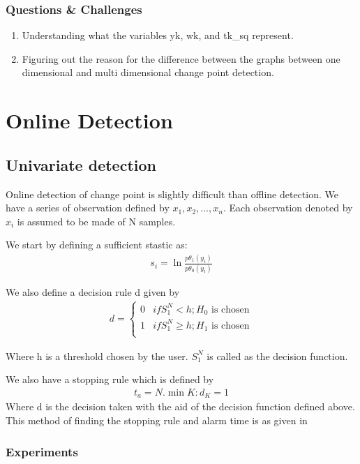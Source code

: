 \documentclass{article}
\begin{document}
\subsubsection{Questions \& Challenges}
\begin{enumerate}
  \item Understanding what the variables yk, wk, and tk\_sq represent.
  \item Figuring out the reason for the difference between the graphs between one dimensional and multi dimensional change point detection.
\end{enumerate}

\section{Online Detection}
\subsection{Univariate detection}
Online detection of change point is slightly difficult than offline detection. We have a series of observation defined by $x_{1}, x_{2}, \ldots, x_{n} $.  Each observation denoted by $x_{i}$ is assumed to be made of N samples.

We start by defining a sufficient stastic as:
\begin{align}
  s_{i} = \ln{\frac{p\theta_{1}(y_{i})}{p\theta_{0}(y_{i})}}
\end{align}

We also define a decision rule d given by
\begin{align}
  d = \begin{cases}
    0 & if S_{1}^{N} < h; H_{0} \text{~is chosen}\\
    1 & if S_{1}^{N} \ge h; H_{1} \text{~is chosen}\\
      \end{cases}
\end{align}

Where h is a threshold chosen by the user.  $S_{1}^{N}$ is called as the decision function.

We also have a stopping rule which is defined by 
\begin{align}
  t_{a} = N.\min{K : d_{K} = 1}
\end{align}
Where d is the decision taken with the aid of the decision function defined above.  This method of finding the stopping rule and alarm time is as given in\cite{basseville_nikiforov}

\subsubsection{Experiments}
\end{document}
